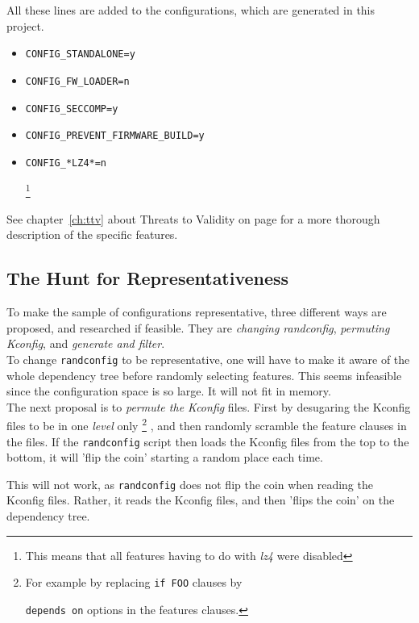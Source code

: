 \documentclass[a4paper,11pt]{report}
\newcommand{\textcode}[1]{
    \fboxsep=1pt
    \texttt{\colorbox{gray!20}{#1}}
}
\begin{document}
All these lines are added to the configurations, which are generated in
this project.

\begin{itemize}
    \item \textcode{CONFIG\_STANDALONE=y}
    \item \textcode{CONFIG\_FW\_LOADER=n}
    \item \textcode{CONFIG\_SECCOMP=y}
    \item \textcode{CONFIG\_PREVENT\_FIRMWARE\_BUILD=y}
    \item \textcode{CONFIG\_*LZ4*=n}
        \footnote{This means that all features having to do with \emph{lz4} 
                    were disabled}
\end{itemize}

See chapter~\ref{ch:ttv} about Threats to Validity on page \pageref{ch:ttv} 
for a more thorough description of the specific features.


    \subsection{The Hunt for Representativeness}
    \label{rephunt}
To make the sample of configurations representative, three different ways are
proposed, and researched if feasible. They are \emph{changing randconfig}, 
\emph{permuting Kconfig}, and \emph{generate and filter}.
\\

To change \texttt{randconfig} to be representative, one will have to make 
it aware of the whole dependency tree before randomly selecting features. This 
seems infeasible since the configuration space is so large. It will not fit 
in memory. 
\\

The next proposal is to \emph{permute the Kconfig} files. First by desugaring 
the Kconfig files to be in one \emph{level} only
    \footnote{For example by replacing \textcode{if FOO} clauses by 
    \textcode{depends on} options in the features clauses.}
, and then randomly scramble the feature 
clauses in the files. If the \texttt{randconfig} script then loads the Kconfig
files from the top to the bottom, it will 'flip the coin' starting a random 
place each time.

This will not work, as \texttt{randconfig} does not flip the coin when reading 
the Kconfig files. Rather, it reads the Kconfig files, and then 'flips the 
coin' on the dependency tree.
\\
\end{document}
